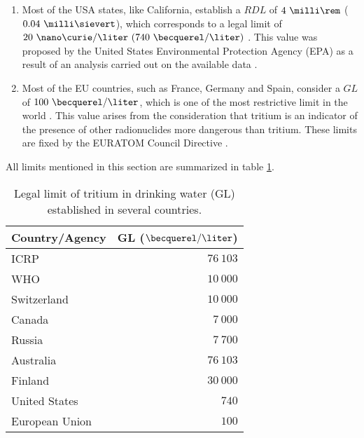 \begin{enumerate}
\item{} Most of the USA states, like California, establish a $RDL$ of $4~\milli\rem$ ($0.04~\milli\sievert$), which corresponds to a legal limit of $20~\nano\curie/\liter~(740~\becquerel/\liter)$ \cite{California_GL}. This value was proposed by the United States Environmental Protection Agency (EPA) as a result of an analysis carried out on the available data \cite{USEPA_GL}.

\item{} Most of the EU countries, such as France, Germany and Spain, consider a $GL$ of $100~\becquerel/\liter$, which is one of the most restrictive limit in the world \cite{France_GL, Germany_GL, Spain_GL}. This value arises from the consideration that tritium is an indicator of the presence of other radionuclides more dangerous than tritium. These limits are fixed by the EURATOM Council Directive \cite{EURATOM_GL}. 
\end{enumerate}

All limits mentioned in this section are summarized in table \ref{tab:LegalLimitTritium}.

\begin{table}[htbp]
\centering{}%
\begin{tabular}{lr}
\toprule 
Country/Agency & GL ($\becquerel/\liter$) \tabularnewline
\midrule
\midrule 
ICRP & $76~103$ \tabularnewline
WHO & $10~000$ \tabularnewline
Switzerland & $10~000$ \tabularnewline
Canada & $7~000$ \tabularnewline
Russia & $7~700$ \tabularnewline
Australia & $76~103$ \tabularnewline
Finland & $30~000$ \tabularnewline
United States & $740$ \tabularnewline
European Union & $100$ \tabularnewline
\bottomrule
\end{tabular}
\caption{Legal limit of tritium in drinking water (GL) established in several countries.}
\label{tab:LegalLimitTritium}
\end{table}